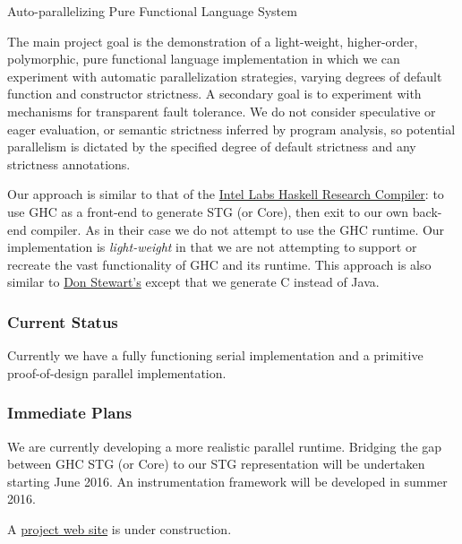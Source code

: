 \documentclass[DIV16,twocolumn,10pt]{scrreprt}
\begin{document}
\begin{hcarentry}{Auto-parallelizing Pure Functional Language System}
\makeheader


The main project goal is the demonstration of a light-weight, higher-order,
polymorphic, pure functional language implementation in which we can
experiment with automatic parallelization strategies, varying degrees of
default function and constructor strictness.  A secondary goal is to
experiment with mechanisms for transparent fault tolerance.
%
We do not consider speculative or eager evaluation, or semantic strictness
inferred by program analysis, so potential parallelism is dictated by the
specified degree of default strictness and any strictness annotations.

Our approach is similar to that of the
\href{https://dl.acm.org/citation.cfm?id=2503779}{Intel
  Labs Haskell Research Compiler}: to use GHC as a front-end to generate STG
(or Core), then exit to our own back-end compiler.  As in their case we do not
attempt to use the GHC runtime.  Our implementation is \emph{light-weight} in
that we are not attempting to support or recreate the vast functionality of
GHC and its runtime.  This approach is also similar to
\href{http://www.cse.unsw.edu.au/~pls/thesis/dons-thesis.ps.gz}{Don Stewart's}
except that we generate C instead of Java.

\subsubsection*{Current Status}
Currently we have a fully functioning serial implementation and a primitive
proof-of-design parallel implementation.


\subsubsection*{Immediate Plans}

We are currently developing a more realistic parallel runtime.
%
Bridging the gap between GHC STG (or Core) to our STG representation will be
undertaken starting June 2016.  An instrumentation framework will be developed
in summer 2016.

\FurtherReading
 A \href{https://github.com/losalamos/APPFL}{project web site} is under construction.


\end{hcarentry}
\end{document}
